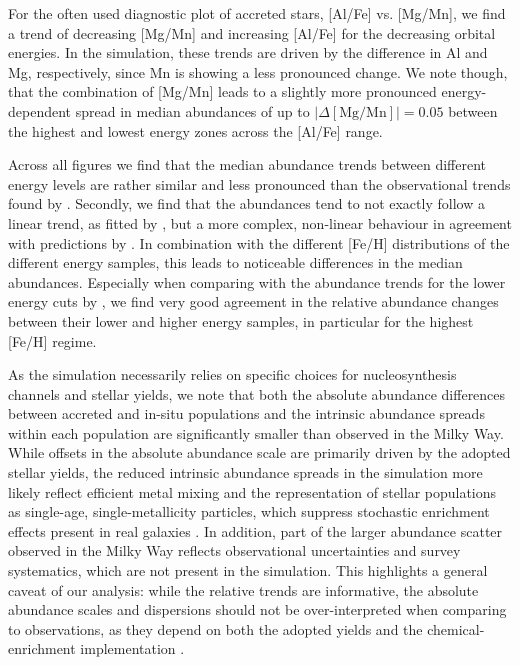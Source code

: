 \documentclass[fleqn,usenatbib]{mnras}
\newcommand{\changed}[1]{{{#1}}}
\begin{document}
For the often used diagnostic plot of accreted stars, [Al/Fe] vs. [Mg/Mn], we find a trend of decreasing [Mg/Mn] and increasing [Al/Fe] for the decreasing orbit\changed{al} energies. In the simulation, these trends are driven by the difference in Al and Mg, respectively, since Mn is showing a less pronounced change. We note though, that the combination of [Mg/Mn] leads to a slightly more pronounced energy-dependent spread \changed{in} median abundances of up to $\vert\Delta\mathrm{[Mg/Mn]}\vert = 0.05$ between the highest and lowest energy zones across the [Al/Fe] range.

Across all figures we find that the median abundance trends between different energy levels are rather similar and less pronounced than the observational trends found by \citet{Skuladottir2025}. Secondly, we find that the abundances tend to not exactly follow a linear trend, as fitted by \citet{Skuladottir2025}, but a more complex, non-linear behaviour \changed{in agreement with predictions by \citet{Khoperskov2023c}}. In combination with the different [Fe/H] distributions of the different energy samples, this leads to noticeable differences in the median abundances. Especially when comparing with the abundance trends for the lower energy cuts by \citet[][their Fig.~5]{Skuladottir2025}, we find very good agreement in the relative abundance changes between their lower and higher energy samples, in particular for the highest [Fe/H] regime.

As the simulation necessarily relies on specific choices for nucleosynthesis channels and stellar yields, we note that both the absolute abundance differences between accreted and in-situ populations and the intrinsic abundance spreads within each population are significantly smaller than observed in the Milky Way. \changed{While offsets in the absolute abundance scale are primarily driven by the adopted stellar yields, the reduced intrinsic abundance spreads in the simulation more likely reflect efficient metal mixing and the representation of stellar populations as single-age, single-metallicity particles, which suppress stochastic enrichment effects present in real galaxies \citep[see also discussion in][]{Buck2021}. In addition, part of the larger abundance scatter observed in the Milky Way reflects observational uncertainties and survey systematics, which are not present in the simulation.} This highlights a general caveat of our analysis: while the relative trends are informative, the absolute abundance scales and dispersions should not be over-interpreted \changed{when comparing to observations}, as they depend on both the adopted yields and the chemical-enrichment implementation \citep[see][for machine-learning-based model comparison approaches to select chemical enrichment models]{Buck2025,Guenes2025}.
\end{document}
